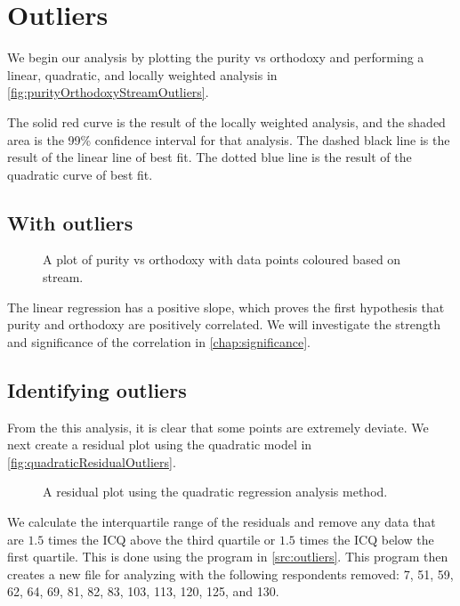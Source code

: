 \chapter{Outliers}\label{chap:outliers}

We begin our analysis by plotting the purity vs orthodoxy and performing a linear, quadratic, and locally weighted analysis in \vref{fig:purityOrthodoxyStreamOutliers}.

The solid red curve is the result of the locally weighted analysis, and the shaded area is the 99\% confidence interval for that analysis.
The dashed black line is the result of the linear line of best fit.
The dotted blue line is the result of the quadratic curve of best fit.

\section{With outliers}
\begin{figure}[H]
	\caption{A plot of purity vs orthodoxy with data points coloured based on stream.}
	\label{fig:purityOrthodoxyStreamOutliers}
\end{figure}

The linear regression has a positive slope, which proves the first hypothesis that purity and orthodoxy are positively correlated.
We will investigate the strength and significance of the correlation in \vref{chap:significance}.

\section{Identifying outliers}
From the this analysis, it is clear that some points are extremely deviate.
We next create a residual plot using the quadratic model in \vref{fig:quadraticResidualOutliers}.

\begin{figure}[H]
	\caption{A residual plot using the quadratic regression analysis method.}
	\label{fig:quadraticResidualOutliers}
\end{figure}

We calculate the interquartile range of the residuals and remove any data that are $1.5$ times the ICQ above the third quartile or $1.5$ times the ICQ below the first quartile.
This is done using the program in \vref{src:outliers}.
This program then creates a new file for analyzing with the following respondents removed: 7, 51, 59, 62, 64, 69, 81, 82, 83, 103, 113, 120, 125, and 130.

